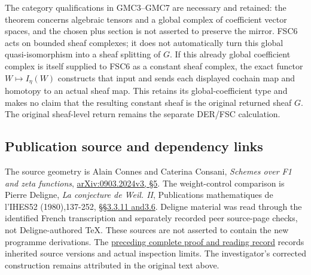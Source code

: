The category qualifications in GMC3--GMC7 are necessary and retained:
the theorem concerns algebraic tensors and a global complex of
coefficient vector spaces, and the chosen plus section is not asserted
to preserve the mirror. FSC6 acts on bounded sheaf complexes; it does
not automatically turn this global quasi-isomorphism into a sheaf
splitting of \(G\). If this already global coefficient complex is itself
supplied to FSC6 as a constant sheaf complex, the exact functor
\(W\mapsto I_\eta(W)\) constructs that input and sends each displayed
cochain map and homotopy to an actual sheaf map. This retains its
global-coefficient type and makes no claim that the resulting constant
sheaf is the original returned sheaf \(G\). The original sheaf-level
return remains the separate DER/FSC calculation.

\subsection{Publication source and dependency
links}\label{publication-source-and-dependency-links}

The source geometry is Alain Connes and Caterina Consani, \emph{Schemes
over F1 and zeta functions},
\href{https://arxiv.org/abs/0903.2024v3}{arXiv:0903.2024v3, §5}. The
weight-control comparison is Pierre Deligne, \emph{La conjecture de
Weil. II}, Publications mathematiques de l'IHES52 (1980),137-252,
\href{https://www.numdam.org/item/PMIHES_1980__52__137_0/}{§§3.3.11
and3.6}. Deligne material was read through the identified French
transcription and separately recorded peer source-page checks, not
Deligne-authored TeX. These sources are not asserted to contain the new
programme derivations. The
\href{https://github.com/KokunoYumeto/zeta-function-research-reader/blob/36a82ecca98addb8a98b48204e349737856c7223/workbenches/splitzero-tandem/continuations/20260924-cohomology-weight-and-character-lifts/BUILD_AND_REVIEW.md}{preceding
complete proof and reading record} records inherited source versions and
actual inspection limits. The investigator's corrected construction
remains attributed in the original text above.
